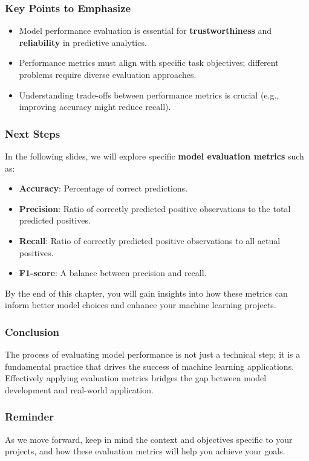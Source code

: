 \documentclass[aspectratio=169]{beamer}
\begin{document}
\begin{frame}[fragile]
    \frametitle{Key Points to Emphasize}
    \begin{itemize}
        \item Model performance evaluation is essential for \textbf{trustworthiness} and \textbf{reliability} in predictive analytics.
        \item Performance metrics must align with specific task objectives; different problems require diverse evaluation approaches.
        \item Understanding trade-offs between performance metrics is crucial (e.g., improving accuracy might reduce recall).
    \end{itemize}
\end{frame}

\begin{frame}[fragile]
    \frametitle{Next Steps}
    In the following slides, we will explore specific \textbf{model evaluation metrics} such as:
    \begin{itemize}
        \item \textbf{Accuracy}: Percentage of correct predictions.
        \item \textbf{Precision}: Ratio of correctly predicted positive observations to the total predicted positives.
        \item \textbf{Recall}: Ratio of correctly predicted positive observations to all actual positives.
        \item \textbf{F1-score}: A balance between precision and recall.
    \end{itemize}
    By the end of this chapter, you will gain insights into how these metrics can inform better model choices and enhance your machine learning projects.
\end{frame}

\begin{frame}[fragile]
    \frametitle{Conclusion}
    The process of evaluating model performance is not just a technical step; it is a fundamental practice that drives the success of machine learning applications. Effectively applying evaluation metrics bridges the gap between model development and real-world application.
\end{frame}

\begin{frame}[fragile]
    \frametitle{Reminder}
    As we move forward, keep in mind the context and objectives specific to your projects, and how these evaluation metrics will help you achieve your goals.
\end{frame}
\end{document}
